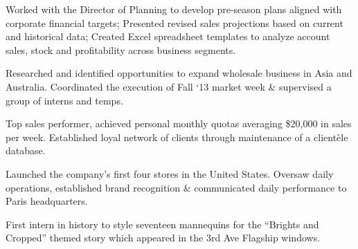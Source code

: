 \documentclass[10pt,letterpaper]{clar-resume}
\begin{document}
\begin{minipage}[t]{0.66\textwidth}
\smallspace 


 \hfill
{}
Worked with the Director of Planning to develop pre-season plans aligned with corporate financial targets; Presented revised sales projections based on current and historical data; Created Excel spreadsheet templates to analyze account sales, stock and profitability across business segments.

\smallspace 


 \hfill
{}
Researched and identified opportunities to expand wholesale business in Asia and Australia. Coordinated the execution of Fall `13 market week \& supervised a group of interns and temps.

\smallspace

 \hfill
{}
Top sales performer, achieved personal monthly quotas averaging \$20,000 in sales per week.  Established loyal network of clients through maintenance of a clientèle database.

\smallspace 


 \hfill
{}
Launched the company's first four stores in the United States.  Oversaw daily operations, established brand recognition \& communicated daily performance to Paris headquarters.

\smallspace 


 \hfill
{}
First intern in history to style seventeen mannequins for the ``Brights and Cropped'' themed story which appeared in the 3rd Ave Flagship windows.

\smallspace 


\end{minipage} %
\end{document}
